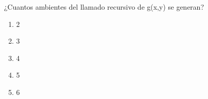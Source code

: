 {
¿Cuantos ambientes del llamado recursivo de g(x,y) se generan?
\begin{enumerate}
	\item 2
	\item 3
	\item 4 
	\item 5
	\item 6 %
\end{enumerate}
}
